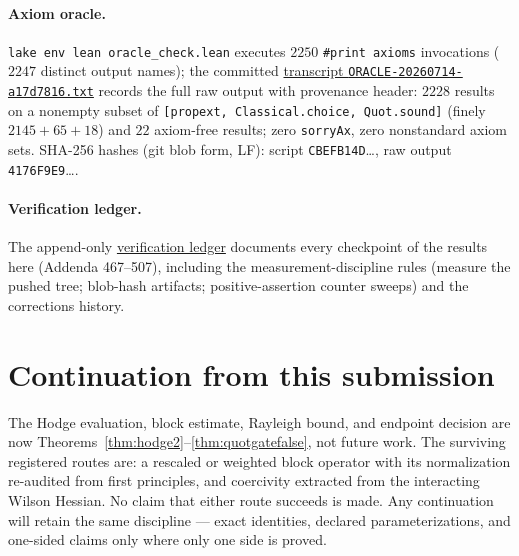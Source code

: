\documentclass[11pt]{article}
\theoremstyle{definition}
\newcommand{\lean}[1]{\texttt{#1}}
\begin{document}
\paragraph{Axiom oracle.}  \lean{lake env lean oracle\_check.lean}
executes $2250$ \lean{\#print axioms} invocations ($2247$ distinct output
names); the committed
\href{https://github.com/lluiseriksson/THE-ERIKSSON-PROGRAMME/blob/3923b93272ac9bf3b13de5e1539b522ddbbcbc95/docs/oracle-transcripts/ORACLE-20260714-a17d7816.txt}{transcript
\lean{ORACLE-20260714-a17d7816.txt}} records the
full raw output with provenance header: $2228$ results on a nonempty
subset of \lean{[propext, Classical.choice, Quot.sound]} (finely
$2145+65+18$) and $22$ axiom-free results; zero \lean{sorryAx}, zero
nonstandard axiom sets.  SHA-256 hashes (git blob form, LF):
script \lean{CBEFB14D}\ldots, raw output \lean{4176F9E9}\ldots.

\paragraph{Verification ledger.}  The append-only
\href{https://github.com/lluiseriksson/THE-ERIKSSON-PROGRAMME/blob/3923b93272ac9bf3b13de5e1539b522ddbbcbc95/docs/VERIFICATION-LEDGER.md}{verification ledger}
documents every checkpoint of the
results here (Addenda 467--507), including the measurement-discipline
rules (measure the pushed tree; blob-hash artifacts; positive-assertion
counter sweeps) and the corrections history.

\section*{Continuation from this submission}

The Hodge evaluation, block estimate, Rayleigh bound, and endpoint
decision are now Theorems~\ref{thm:hodge2}--\ref{thm:quotgatefalse}, not
future work.  The surviving registered routes are: a rescaled or weighted
block operator with its normalization re-audited from first principles,
and coercivity extracted from the interacting Wilson Hessian.  No claim
that either route succeeds is made.  Any continuation will retain the
same discipline --- exact identities, declared parameterizations, and
one-sided claims only where only one side is proved.
\end{document}
